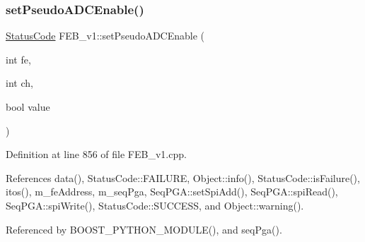 \subsubsection{\texorpdfstring{set\+Pseudo\+A\+D\+C\+Enable()}{setPseudoADCEnable()}}
{\footnotesize\ttfamily \hyperlink{classStatusCode}{Status\+Code} F\+E\+B\+\_\+v1\+::set\+Pseudo\+A\+D\+C\+Enable (\begin{DoxyParamCaption}\item[{int}]{fe,  }\item[{int}]{ch,  }\item[{bool}]{value }\end{DoxyParamCaption})}



Definition at line 856 of file F\+E\+B\+\_\+v1.\+cpp.



References data(), Status\+Code\+::\+F\+A\+I\+L\+U\+RE, Object\+::info(), Status\+Code\+::is\+Failure(), itos(), m\+\_\+fe\+Address, m\+\_\+seq\+Pga, Seq\+P\+G\+A\+::set\+Spi\+Add(), Seq\+P\+G\+A\+::spi\+Read(), Seq\+P\+G\+A\+::spi\+Write(), Status\+Code\+::\+S\+U\+C\+C\+E\+SS, and Object\+::warning().



Referenced by B\+O\+O\+S\+T\+\_\+\+P\+Y\+T\+H\+O\+N\+\_\+\+M\+O\+D\+U\+L\+E(), and seq\+Pga().


